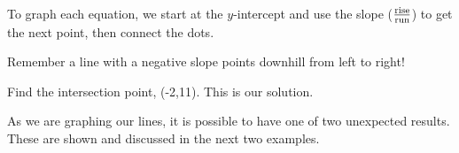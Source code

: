 \begin{example}
\begin{multicols}{2}
    To graph each equation, we start at the $y$-intercept and use the slope
    ($\frac{\operatorname{rise}}{\operatorname{run}}$) to get the next point, then connect the
    dots.\pp
    
    Remember a line with a negative slope points downhill from left to right!
  \end{multicols}
    \begin{center}
    Find the intersection point, (-2,11).  This is our solution.
		\end{center}
\end{example}


As we are graphing our lines, it is possible to have one of two unexpected
results. These are shown and discussed in the next two examples.\pp

\vspace{1in}
~\\

